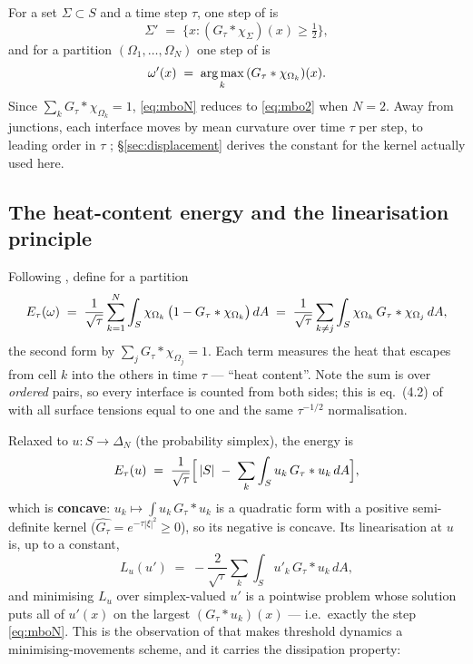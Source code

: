 \documentclass[11pt,a4paper]{article}
\begin{document}
For a set $\Sigma \subset S$ and a time step $\tau$, one step of
\cite{merriman1992diffusion} is
\begin{equation}
  \Sigma' \;=\; \bigl\{ x : (G_\tau * \chi_\Sigma)(x) \ge \tfrac12 \bigr\},
  \label{eq:mbo2}
\end{equation}
and for a partition $(\Omega_1, \dots, \Omega_N)$ one step of
\cite{merriman1994motion} is
\begin{equation}
  \omega'(x) \;=\; \operatorname*{arg\,max}_k \, (G_\tau * \chi_{\Omega_k})(x).
  \label{eq:mboN}
\end{equation}
Since $\sum_k G_\tau * \chi_{\Omega_k} = 1$, \eqref{eq:mboN} reduces to
\eqref{eq:mbo2} when $N = 2$. Away from junctions, each interface moves by mean
curvature over time $\tau$ per step, to leading order in $\tau$
\cite{evans1993convergence, esedoglu2015threshold}; \S\ref{sec:displacement}
derives the constant for the kernel actually used here.

\subsection{The heat-content energy and the linearisation principle}
\label{sec:heat-content}

Following \cite[\S4]{esedoglu2015threshold}, define for a partition
\begin{equation}
  E_\tau(\omega) \;=\; \frac{1}{\sqrt\tau} \sum_{k=1}^{N}
    \int_S \chi_{\Omega_k}\,\bigl(1 - G_\tau * \chi_{\Omega_k}\bigr)\, dA
  \;=\; \frac{1}{\sqrt\tau} \sum_{k \ne j} \int_S \chi_{\Omega_k}\, G_\tau * \chi_{\Omega_j}\, dA,
  \label{eq:heat-content}
\end{equation}
the second form by $\sum_j G_\tau * \chi_{\Omega_j} = 1$. Each term measures the
heat that escapes from cell $k$ into the others in time $\tau$ --- ``heat
content''. Note the sum is over \emph{ordered} pairs, so every interface is
counted from both sides; this is eq.~(4.2) of \cite{esedoglu2015threshold} with
all surface tensions equal to one and the same $\tau^{-1/2}$ normalisation.

Relaxed to $u : S \to \Delta_N$ (the probability simplex), the energy is
\begin{equation}
  E_\tau(u) \;=\; \frac{1}{\sqrt\tau}\Bigl[\, |S| \;-\; \sum_k \int_S u_k\, G_\tau * u_k \, dA \Bigr],
  \label{eq:relaxed}
\end{equation}
which is \textbf{concave}: $u_k \mapsto \int u_k\, G_\tau * u_k$ is a quadratic
form with a positive semi-definite kernel ($\widehat{G_\tau} = e^{-\tau|\xi|^2} \ge 0$),
so its negative is concave. Its linearisation at $u$ is, up to a constant,
\begin{equation}
  L_u(u') \;=\; -\frac{2}{\sqrt\tau} \sum_k \int_S u'_k\, G_\tau * u_k\, dA,
  \label{eq:linearisation}
\end{equation}
and minimising $L_u$ over simplex-valued $u'$ is a pointwise problem whose
solution puts all of $u'(x)$ on the largest $(G_\tau * u_k)(x)$ --- i.e.\ exactly
the step \eqref{eq:mboN}. This is the observation of
\cite{esedoglu2015threshold} that makes threshold dynamics a
minimising-movements scheme, and it carries the dissipation property:
\end{document}
